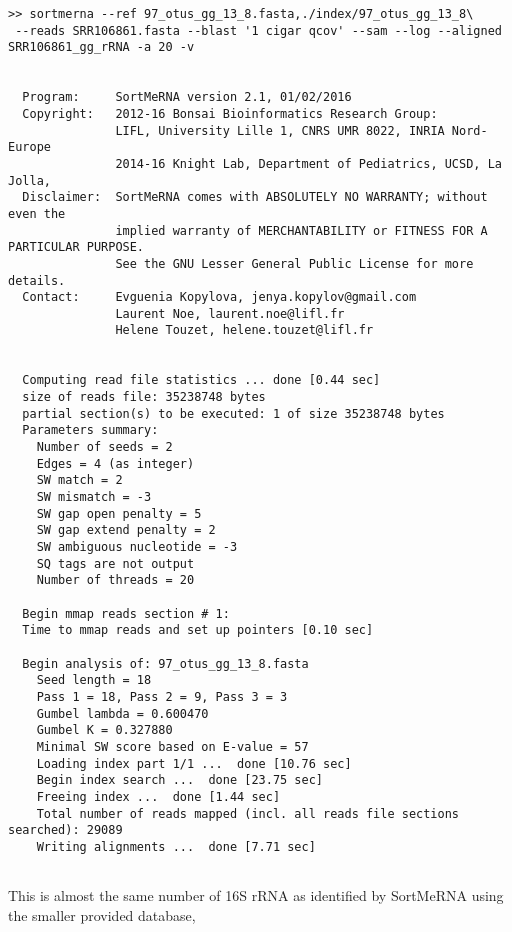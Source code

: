 \documentclass[10pt,a4paper]{article}
\begin{document}
\begin{Verbatim}[fontsize=\footnotesize]
>> sortmerna --ref 97_otus_gg_13_8.fasta,./index/97_otus_gg_13_8\
 --reads SRR106861.fasta --blast '1 cigar qcov' --sam --log --aligned SRR106861_gg_rRNA -a 20 -v 


  Program:     SortMeRNA version 2.1, 01/02/2016
  Copyright:   2012-16 Bonsai Bioinformatics Research Group:
               LIFL, University Lille 1, CNRS UMR 8022, INRIA Nord-Europe
               2014-16 Knight Lab, Department of Pediatrics, UCSD, La Jolla,
  Disclaimer:  SortMeRNA comes with ABSOLUTELY NO WARRANTY; without even the
               implied warranty of MERCHANTABILITY or FITNESS FOR A PARTICULAR PURPOSE.
               See the GNU Lesser General Public License for more details.
  Contact:     Evguenia Kopylova, jenya.kopylov@gmail.com 
               Laurent Noe, laurent.noe@lifl.fr
               Helene Touzet, helene.touzet@lifl.fr


  Computing read file statistics ... done [0.44 sec]
  size of reads file: 35238748 bytes
  partial section(s) to be executed: 1 of size 35238748 bytes 
  Parameters summary:
    Number of seeds = 2
    Edges = 4 (as integer)
    SW match = 2
    SW mismatch = -3
    SW gap open penalty = 5
    SW gap extend penalty = 2
    SW ambiguous nucleotide = -3
    SQ tags are not output
    Number of threads = 20

  Begin mmap reads section # 1:
  Time to mmap reads and set up pointers [0.10 sec]

  Begin analysis of: 97_otus_gg_13_8.fasta
    Seed length = 18
    Pass 1 = 18, Pass 2 = 9, Pass 3 = 3
    Gumbel lambda = 0.600470
    Gumbel K = 0.327880
    Minimal SW score based on E-value = 57
    Loading index part 1/1 ...  done [10.76 sec]
    Begin index search ...  done [23.75 sec]
    Freeing index ...  done [1.44 sec]
    Total number of reads mapped (incl. all reads file sections searched): 29089
    Writing alignments ...  done [7.71 sec]
              
\end{Verbatim}

This is almost the same number of 16S rRNA as identified by SortMeRNA using the smaller provided database,
\end{document}
